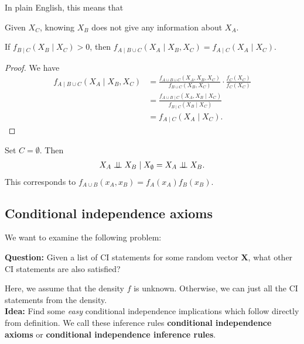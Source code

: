 In plain English, this means that 
\begin{mdframed}
  \begin{center}
    Given \( X_C \), knowing \( X_B \) does not give any information about \( X_A \).
  \end{center}
\end{mdframed}

\begin{prop}
  If \( f_{B \mid C} (X_B \mid X_C) > 0 \), then \(   f_{A \mid B \cup C} (X_A \mid X_B, X_C) = f_{A \mid C}(X_A \mid X_C)  \).
\end{prop}
\begin{proof}
  We have
  \begin{align*}
    f_{A \mid B \cup C} (X_A \mid X_B, X_C) &= \frac{f_{A \cup B \cup C}(X_A,X_B,X_C)}{f_{B \cup C}(X_B,X_C)} \cdot \frac{f_C(X_C)}{f_C(X_C)} \\
    &= \frac{f_{A \cup B \mid C}(X_A,X_B\mid X_C)}{f_{B \mid C}(X_B \mid X_C)} \\ 
    &= f_{A \mid C}(X_A \mid X_C).
  \end{align*}
\end{proof}


\begin{eg}
  Set \( C = \emptyset \). Then 
  \begin{align*}
    X_A \perp \!\!\! \perp X_B \mid X_\emptyset = X_A \perp \!\!\! \perp X_B.
  \end{align*}
  This corresponds to \( f_{A \cup B}(x_A,x_B) = f_A(x_A)f_B(x_B) \).
\end{eg}

\subsection{Conditional independence axioms}

We want to examine the following problem:
\begin{mdframed}
\begin{center}    
  \textbf{Question:} Given a list of CI statements for some random vector \( \mathbf X \), what other CI statements are also satisfied?
\end{center}
\end{mdframed}
Here, we assume that the density \( f \) is unknown. Otherwise, we can just all the CI statements from the density. \\

\textbf{Idea:} Find some \emph{easy} conditional independence implications which follow directly from definition. We call these inference rules {\textbf{conditional independence axioms}} or \textbf{conditional independence inference rules}.\\

